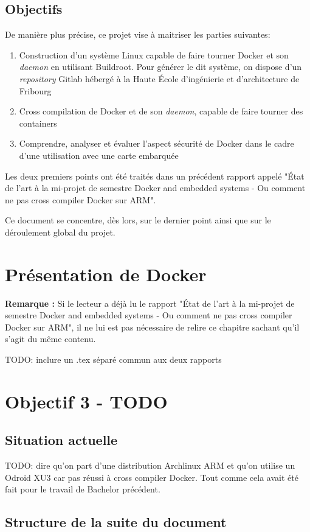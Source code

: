 \documentclass[11pt,a4paper,oneside]{report}
\newcommand{\school}{Haute École d'ingénierie et d'architecture de Fribourg}
\newcommand{\oldreportname}{État de l’art à la mi-projet de semestre Docker and embedded systems - Ou comment ne pas cross compiler Docker sur ARM}
\begin{document}
\section{Objectifs}

De manière plus précise, ce projet vise à maitriser les parties suivantes:

\begin{enumerate}
  \item Construction d'un système Linux capable de faire tourner Docker et son \emph{daemon} en utilisant Buildroot. Pour générer le dit système, on dispose d'un \emph{repository} Gitlab hébergé à la \school

  \item Cross compilation de Docker et de son \emph{daemon}, capable de faire tourner des containers
  
  \item Comprendre, analyser et évaluer l'aspect sécurité de Docker dans le cadre d'une utilisation avec une carte embarquée
\end{enumerate}

Les deux premiers points ont été traités dans un précédent rapport appelé "\oldreportname".

Ce document se concentre, dès lors, sur le dernier point ainsi que sur le déroulement global du projet.

\chapter{Présentation de Docker}

\textbf{Remarque : } Si le lecteur a déjà lu le rapport "\oldreportname", il ne lui est pas nécessaire de relire ce chapitre sachant qu'il s'agit du même contenu.

TODO: inclure un .tex séparé commun aux deux rapports

\chapter{Objectif 3 - TODO}

\section{Situation actuelle}
TODO: dire qu'on part d'une distribution Archlinux ARM et qu'on utilise un Odroid XU3 car pas réussi à cross compiler Docker. Tout comme cela avait été fait pour le travail de Bachelor précédent.


\section{Structure de la suite du document}
\end{document}
